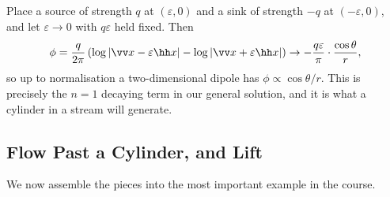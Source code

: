 \begin{example}
	Place a source of strength $q$ at $(\varepsilon, 0)$ and a sink of strength $-q$ at $(-\varepsilon, 0)$, and let $\varepsilon \to 0$ with $q\varepsilon$ held fixed. Then
	$$
	\phi = \frac{q}{2\pi}\left(\log|\vv x - \varepsilon\hh x| - \log|\vv x + \varepsilon \hh x|\right) \to -\frac{q\varepsilon}{\pi}\cdot\frac{\cos\theta}{r},
	$$
	so up to normalisation a two-dimensional dipole has $\phi \propto \cos\theta/r$. This is precisely the $n = 1$ decaying term in our general solution, and it is what a cylinder in a stream will generate.
\end{example}

\subsection{Flow Past a Cylinder, and Lift}

We now assemble the pieces into the most important example in the course.

